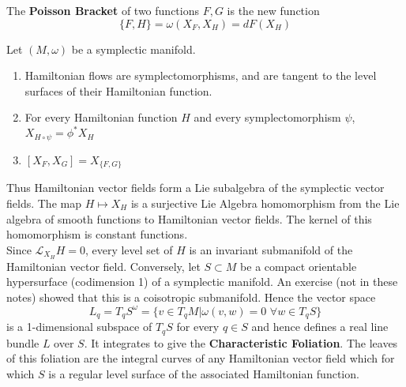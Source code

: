 \begin{defn}
The \textbf{Poisson Bracket} of two functions $F,G$ is the new function
\begin{equation}
    \{F,H\} = \omega(X_F, X_H) = dF(X_H)
\end{equation}
\end{defn}


\begin{prop}
Let $(M,\omega)$ be a symplectic manifold.
\begin{enumerate}
    \item Hamiltonian flows are symplectomorphisms, and are tangent to the level surfaces of their Hamiltonian function.
    \item For every Hamiltonian function $H$ and every symplectomorphism $\psi$, $X_{H \circ \psi}=\phi^* X_H$
    \item $[X_F,X_G]=X_{\{F,G\}}$
\end{enumerate}
\end{prop}

\indent Thus Hamiltonian vector fields form a Lie subalgebra of the symplectic vector fields. The map $H \mapsto X_H$ is a surjective Lie Algebra homomorphism from the Lie algebra of smooth functions to Hamiltonian vector fields. The kernel of this homomorphism is constant functions.\\
\indent Since $\mathcal{L}_{X_H}H=0$, every level set of $H$ is an invariant submanifold of the Hamiltonian vector field. Conversely, let $S \subset M$ be a compact orientable hypersurface (codimension 1) of a symplectic manifold. An exercise (not in these notes) showed that this is a coisotropic submanifold. Hence the vector space
\begin{equation}
    L_q = T_q S^{\omega} = \{ v \in T_qM \vert \omega (v,w) = 0 \hspace{4pt} \forall w \in T_q S\}
\end{equation}
is a 1-dimensional subspace of $T_qS$ for every $q \in S$ and hence defines a real line bundle $L$ over $S$. It integrates to give the \textbf{Characteristic Foliation}. The leaves of this foliation are the integral curves of any Hamiltonian vector field which for which $S$ is a regular level surface of the associated Hamiltonian function.
